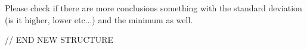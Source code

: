 \documentclass[conference]{IEEEtran}
\begin{document}
Please check if there are more conclusions something with the standard deviation (is it higher, lower etc...) and the minimum as well.

// END NEW STRUCTURE
\end{document}
